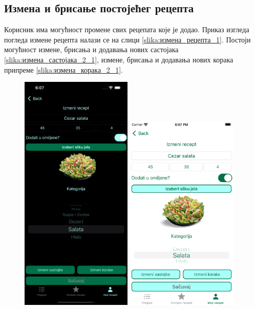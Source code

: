 \documentclass[12pt,oneside]{memoir}
\begin{document}
\subsection{Измена и брисање постојећег рецепта}
\label{subsec:Измена и брисање постојећег рецепта}

\indent Корисник има могућност промене свих рецепата које је додао. Приказ изгледа погледа измене рецепта налази се на слици \ref{slika:измена_рецепта_1}. Постоји могућност измене, брисања и додавања нових састојака \ref{slika:измена_састојака_2_1}, измене, брисања и додавања нових корака припреме \ref{slika:измена_корака_2_1}.

\begin{figure} [H]
    \centering
    \captionsetup{justification=centering}
    \includegraphics[width=0.475\textwidth]{images/simulators/view images/dark - change.png} 
    \hfill
    \includegraphics[width=0.475\textwidth]{images/simulators/view images/light - change.png} 

\end{figure}
\end{document}
